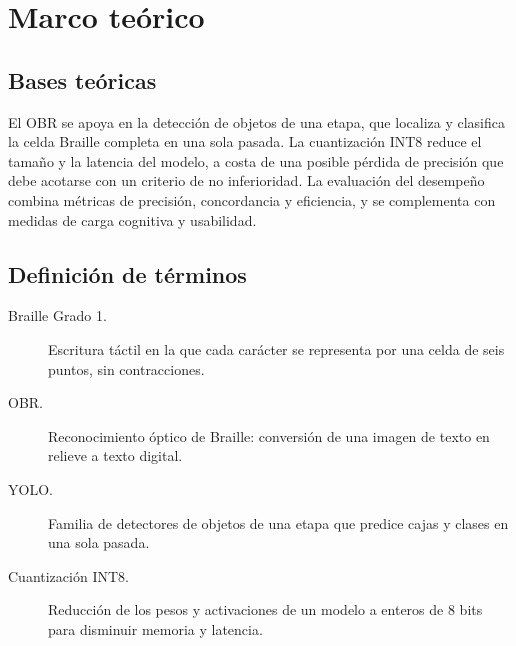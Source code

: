 \section{Marco teórico}

\subsection{Bases teóricas}
El OBR se apoya en la detección de objetos de una etapa, que localiza y clasifica
la celda Braille completa en una sola pasada. La cuantización INT8 reduce el
tamaño y la latencia del modelo, a costa de una posible pérdida de precisión que
debe acotarse con un criterio de no inferioridad. La evaluación del desempeño
combina métricas de precisión, concordancia y eficiencia, y se complementa con
medidas de carga cognitiva y usabilidad.

\subsection{Definición de términos}
\begin{description}
  \item[Braille Grado 1.] Escritura táctil en la que cada carácter se representa
  por una celda de seis puntos, sin contracciones.
  \item[OBR.] Reconocimiento óptico de Braille: conversión de una imagen de texto
  en relieve a texto digital.
  \item[YOLO.] Familia de detectores de objetos de una etapa que predice cajas y
  clases en una sola pasada.
  \item[Cuantización INT8.] Reducción de los pesos y activaciones de un modelo a
  enteros de 8 bits para disminuir memoria y latencia.
\end{description}
